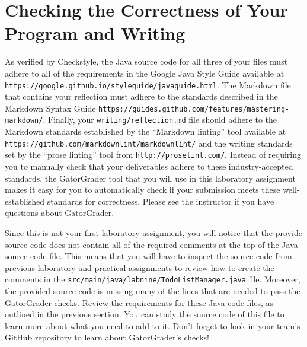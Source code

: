 \documentclass[11pt]{article}
\newcommand{\mainprogramsource}{\lstinline{src/main/java/labnine/TodoListManager.java}}
\newcommand{\reflection}{\lstinline{writing/reflection.md}}
\newcommand{\url}[1]{\lstinline{#1}}
\newcommand{\step}[1]{``{#1}''}
\begin{document}
\section*{Checking the Correctness of Your Program and Writing}

As verified by Checkstyle, the Java source code for all three of your files must adhere to all of the requirements in
the Google Java Style Guide available at \url{https://google.github.io/styleguide/javaguide.html}. The Markdown file
that contains your reflection must adhere to the standards described in the Markdown Syntax Guide
\url{https://guides.github.com/features/mastering-markdown/}. Finally, your \reflection{} file should adhere to the
Markdown standards established by the \step{Markdown linting} tool available at
\url{https://github.com/markdownlint/markdownlint/} and the writing standards set by the \step{prose linting} tool from
\url{http://proselint.com/}. Instead of requiring you to manually check that your deliverables adhere to these
industry-accepted standards, the GatorGrader tool that you will use in this laboratory assignment makes it easy for you
to automatically check if your submission meets these well-established standards for correctness. Please see the
instructor if you have questions about GatorGrader.

Since this is not your first laboratory assignment, you will notice that the provide source code does not contain all of
the required comments at the top of the Java source code file. This means that you will have to inspect the source code
from previous laboratory and practical assignments to review how to create the comments in the \mainprogramsource{}
file. Moreover, the provided source code is missing many of the lines that are needed to pass the GatorGrader checks.
Review the requirements for these Java code files, as outlined in the previous section. You can study the source code of
this file to learn more about what you need to add to it. Don't forget to look in your team's GitHub repository to learn
about GatorGrader's checks!
\end{document}
